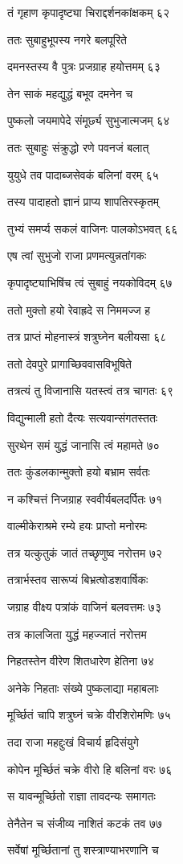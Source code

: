 तं गृहाण कृपादृष्ट्या चिराद्दर्शनकांक्षकम् ६२

ततः सुबाहुभूपस्य नगरे बलपूरिते

दमनस्तस्य वै पुत्रः प्रजग्राह हयोत्तमम् ६३

तेन साकं महद्युद्धं बभूव दमनेन च

पुष्कलो जयमापेदे संमूर्छ्य सुभुजात्मजम् ६४

ततः सुबाहुः संक्रुद्धो रणे पवनजं बलात्

युयुधे तव पादाब्जसेवकं बलिनां वरम् ६५

तस्य पादाहतो ज्ञानं प्राप्य शापतिरस्कृतम्

तुभ्यं समर्प्य सकलं वाजिनः पालकोऽभवत् ६६

एष त्वां सुभुजो राजा प्रणमत्युन्नतांगकः

कृपादृष्ट्याभिषिंच त्वं सुबाहुं नयकोविदम् ६७

ततो मुक्तो हयो रेवाह्रदे स निममज्ज ह

तत्र प्राप्तं मोहनास्त्रं शत्रुघ्नेन बलीयसा ६८

ततो देवपुरे प्रागाच्छिववासविभूषिते

तत्रत्यं तु विजानासि यतस्त्वं तत्र चागतः ६९

विद्युन्माली हतो दैत्यः सत्यवान्संगतस्ततः

सुरथेन समं युद्धं जानासि त्वं महामते ७०

ततः कुंडलकान्मुक्तो हयो बभ्राम सर्वतः

न कश्चित्तं निजग्राह स्ववीर्यबलदर्पितः ७१

वाल्मीकेराश्रमे रम्ये हयः प्राप्तो मनोरमः

तत्र यत्कुतुकं जातं तच्छृणुष्व नरोत्तम ७२

तत्रार्भस्तव सारूप्यं बिभ्रत्षोडशवार्षिकः

जग्राह वीक्ष्य पत्रांकं वाजिनं बलवत्तमः ७३

तत्र कालजिता युद्धं महज्जातं नरोत्तम

निहतस्तेन वीरेण शितधारेण हेतिना ७४

अनेके निहताः संख्ये पुष्कलाद्या महाबलाः

मूर्च्छितं चापि शत्रुघ्नं चक्रे वीरशिरोमणिः ७५

तदा राजा महद्दुःखं विचार्य हृदिसंयुगे

कोपेन मूर्च्छितं चक्रे वीरो हि बलिनां वरः ७६

स यावन्मूर्च्छितो राज्ञा तावदन्यः समागतः

तेनैतेन च संजीव्य नाशितं कटकं तव ७७

सर्वेषां मूर्च्छितानां तु शस्त्राण्याभरणानि च

